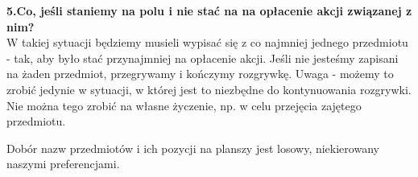 \documentclass[a4paper]{article}
\begin{document}
\noindent \textbf{5.Co, jeśli staniemy na polu i nie stać na na opłacenie akcji związanej z nim?}\\
\noindent W takiej sytuacji będziemy musieli wypisać się z co najmniej jednego przedmiotu - tak, aby było stać przynajmniej na opłacenie akcji. Jeśli nie jesteśmy zapisani na żaden przedmiot, przegrywamy i kończymy rozgrywkę. Uwaga - możemy to zrobić jedynie w sytuacji, w której jest to niezbędne do kontynuowania rozgrywki. Nie można tego zrobić na własne życzenie, np. w celu przejęcia zajętego przedmiotu. 
\vspace{10pt}

\noindent Dobór nazw przedmiotów i ich pozycji na planszy jest losowy, niekierowany naszymi preferencjami.
\end{document}
